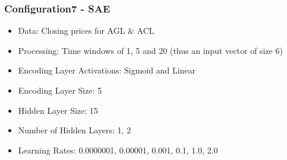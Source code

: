 \documentclass[a4paper,11pt,oneside]{article}
\theoremstyle{plain}
\theoremstyle{definition}
\begin{document}
\subsubsection{Configuration7 - SAE}\label{config7}

\begin{itemize}
	\item Data: Closing prices for AGL \& ACL
	\item Processing: Time windows of 1, 5 and 20 (thus an input vector of size 6)
	\item Encoding Layer Activations: Sigmoid and Linear
	\item Encoding Layer Size: 5
	\item Hidden Layer Size: 15
	\item Number of Hidden Layers: 1, 2
	\item Learning Rates: 0.0000001, 0.00001, 0.001, 0.1, 1.0, 2.0
\end{itemize}
\end{document}
